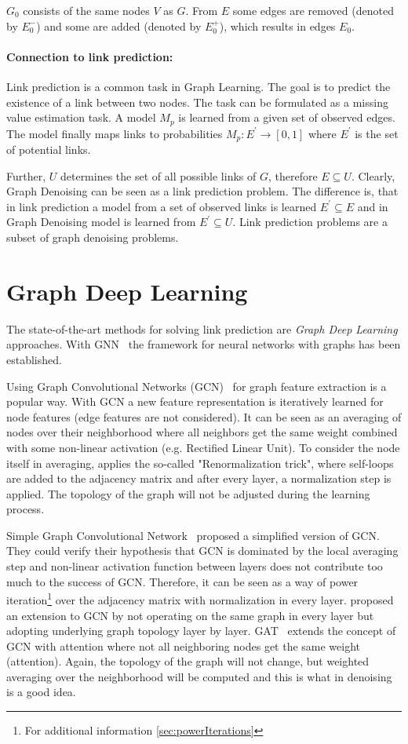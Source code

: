 $G_0$ consists of the same nodes $V$ as $G$. 
From $E$ some edges are removed (denoted by $E^{-}_0$) and some are added
(denoted by $E^{+}_0$), which results in edges $E_0$.

\paragraph{Connection to link prediction:}
Link prediction is a common task in Graph Learning. 
The goal is to predict the existence of a link between two nodes.
The task can be formulated as a missing value estimation task. A model $M_p$ is learned
from a given set of observed edges. The model finally maps links to probabilities
$M_p : E^{\prime} \rightarrow [0,1]$ where $E^{\prime}$ is the set of potential links.

Further, $U$ determines the set of all possible links of $G$, therefore $E \subseteq U$.
Clearly, Graph Denoising can be seen as a link prediction problem.
The difference is, that in link prediction a model from a set of observed links is learned
$E^{\prime} \subseteq E$ and in Graph Denoising model is learned from 
$E^{\prime} \subseteq U$.
Link prediction problems are a subset of graph denoising problems.

\section{Graph Deep Learning}
\label{sec:graph_depp_learning}
The state-of-the-art methods for solving link prediction are \textit{Graph Deep Learning} approaches.
With GNN~\cite{GNN} the framework for neural networks with graphs has been established. 

Using Graph Convolutional Networks (GCN)~\cite{GCN} for graph feature extraction is a popular way. 
With GCN a new feature representation is iteratively learned for node features (edge features are not considered).
It can be seen as an averaging of nodes over their neighborhood where all neighbors get the same weight combined with some non-linear activation (e.g. Rectified Linear Unit). 
To consider the node itself in averaging, \citet{GCN} applies the so-called "Renormalization trick", where self-loops are added to the 
adjacency matrix and after every layer, a normalization step is applied. 
The topology of the graph will not be adjusted during the learning process.

Simple Graph Convolutional Network~\cite{simpleGCN} proposed a simplified version of GCN.
They could verify their hypothesis that GCN is dominated by the local averaging step and non-linear 
activation function between layers does not contribute too much to the success of GCN. 
Therefore, it can be seen as a way of power iteration\footnote{For additional information \ref{sec:powerIterations}}
over the adjacency matrix with normalization in every layer.
\citet{dynamicGCN} proposed an extension to GCN by not operating on the same graph in every layer but adopting
underlying graph topology layer by layer.
GAT~\cite{GAT} extends the concept of GCN with attention where not all neighboring nodes get the same weight (attention).
Again, the topology of the graph will not change, but weighted averaging over the neighborhood 
will be computed and this is what in denoising is a good idea.
